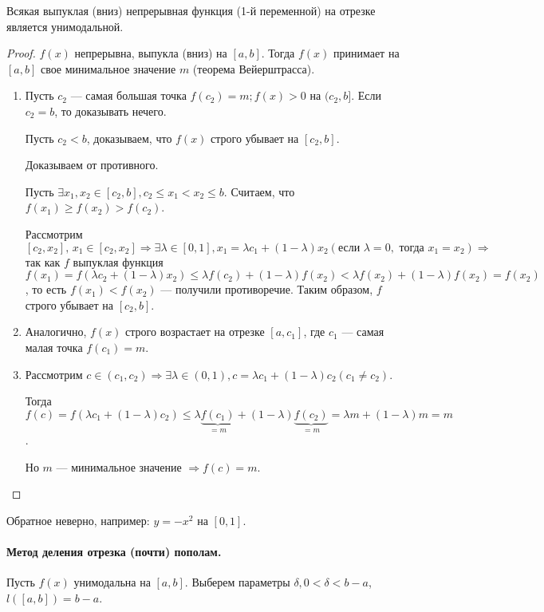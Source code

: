 \begin{theorem}
	Всякая выпуклая (вниз) непрерывная функция (1-й переменной) на отрезке является унимодальной.
\end{theorem}
\begin{proof}
	$f(x)$ непрерывна, выпукла (вниз) на $[a, b]$. Тогда $f(x)$ принимает на $[a, b]$ свое минимальное значение $m$ (теорема Вейерштрасса).
	\begin{enumerate}[label={(\arabic*)}]
		\item Пусть $c_2$ --- самая большая точка $f(c_2) = m; f(x) > 0$ на $(c_2, b]$. Если $c_2 = b$, то доказывать нечего. 
		
		Пусть $c_2 < b$, доказываем, что $f(x)$ строго убывает на $[c_2, b]$. 
		
		Доказываем от противного.
		
		Пусть $\exists x_1, x_2 \in [c_2, b], c_2 \leqslant x_1 < x_2 \leqslant b$. Считаем, что $f(x_1) \geqslant f(x_2) > f(c_2)$.
		
		Рассмотрим $[c_2, x_2], \, x_1 \in [c_2, x_2] \Rightarrow \exists \lambda \in [0, 1], x_1 = \lambda c_1 + (1 - \lambda) x_2 (\text{если } \lambda = 0, \text{ тогда } x_1 = x_2) \Rightarrow$ так как $f$ выпуклая функция $f(x_1) = f(\lambda c_2 + (1 - \lambda) x_2) \leqslant \lambda f(c_2) + (1 - \lambda) f(x_2) < \lambda f(x_2) + (1 - \lambda) f(x_2) = f(x_2)$, то есть $f(x_1) < f(x_2)$ --- получили противоречие. Таким образом, $f$ строго убывает на $[c_2, b]$.
		
		\item Аналогично, $f(x)$ строго возрастает на отрезке $[a, c_1]$, где $c_1$ --- самая малая точка $f(c_1) = m$.
		
		\item Рассмотрим $c \in (c_1, c_2) \Rightarrow \exists \lambda \in (0, 1), c = \lambda c_1 + (1 - \lambda) c_2 (c_1 \not = c_2)$.
		
		Тогда $f(c) = f(\lambda c_1 + (1 - \lambda) c_2) \leqslant \lambda \underbrace{f(c_1)}_{= m} + (1 - \lambda) \underbrace{f(c_2)}_{= m} = \lambda m + (1 - \lambda) m = m$.
		
		Но $m$ --- минимальное значение $\Rightarrow f(c) = m$.
	\end{enumerate}
\end{proof}

\begin{utv}
	Обратное неверно, например: $y = - x^2$ на $[0, 1]$.
\end{utv}

\paragraph{Метод деления отрезка (почти) пополам.}  Пусть $f(x)$ унимодальна на $[a, b]$. Выберем параметры $\delta, 0 < \delta < b - a$, $l([a, b]) = b - a$.
\newline

